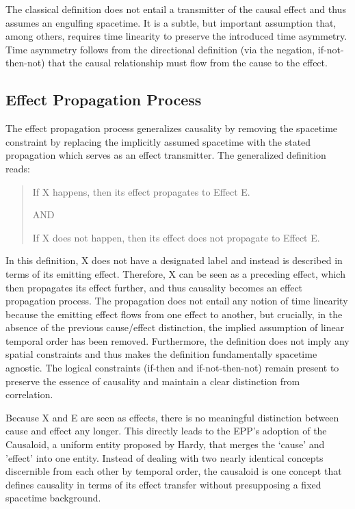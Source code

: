 \documentclass{article}
\begin{document}
The classical definition does not entail a transmitter of the causal effect and thus assumes an engulfing spacetime. It is a subtle, but important assumption that, among others, requires time linearity to preserve the introduced time asymmetry. Time asymmetry follows from the directional definition (via the negation, if-not-then-not) that the causal relationship must flow from the cause to the effect.


\subsection{Effect Propagation Process}
\label{subsec:Effect_Propagation_Process}

The effect propagation process generalizes causality by removing the spacetime constraint by replacing the implicitly assumed spacetime with the stated propagation which serves as an effect transmitter. The generalized definition reads:

\begin{quote}
\begin{center}
        If X happens, then its effect propagates to Effect E.
    
    AND
    
    If X does not happen, then its effect does not propagate to Effect E.
\end{center}
\end{quote}


In this definition, X does not have a designated label and instead is described in terms of its emitting effect. Therefore, X can be seen as a preceding effect, which then propagates its effect further, and thus causality becomes an effect propagation process. The propagation does not entail any notion of time linearity because the emitting effect flows from one effect to another, but crucially, in the absence of the previous cause/effect distinction, the implied assumption of linear temporal order has been removed.
Furthermore, the definition does not imply any spatial constraints and thus makes the definition fundamentally spacetime agnostic. The logical constraints (if-then and if-not-then-not) remain present to preserve the essence of causality and maintain a clear distinction from correlation.

Because X and E are seen as effects, there is no meaningful distinction between cause and effect any longer. This directly leads to the EPP’s adoption of the Causaloid, a uniform entity proposed by Hardy\cite{HardyDynamicCausalStructure}, that merges the ‘cause' and 'effect' into one entity. Instead of dealing with two nearly identical concepts discernible from each other by temporal order, the causaloid is one concept that defines causality in terms of its effect transfer without presupposing a fixed spacetime background\cite{HardyDynamicCausalStructure}.
\end{document}
